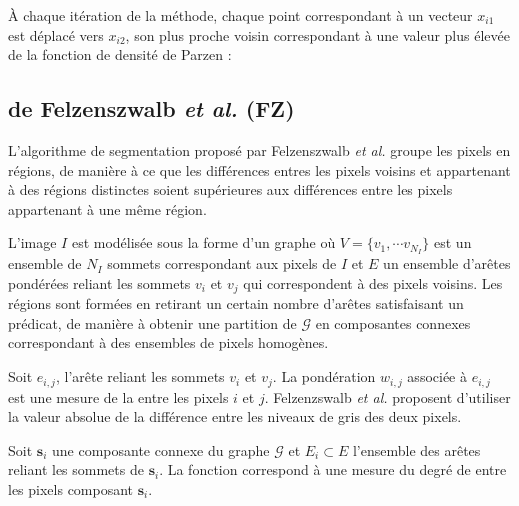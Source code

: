 À chaque itération de la méthode, chaque point correspondant à un vecteur $x_{i1}$ est déplacé vers $x_{i2}$, son plus proche voisin correspondant à une valeur plus élevée de la fonction de densité de Parzen :


\subsection{ de Felzenszwalb \textit{et al.} (FZ)}

L'algorithme de segmentation proposé par Felzenszwalb \textit{et al.} \cite{felzenszwalb2004efficient} groupe les pixels en régions, de manière à ce que les différences entres les pixels voisins et appartenant à des régions distinctes soient supérieures aux différences entre les pixels appartenant à une même région.

L'image $I$ est modélisée sous la forme d'un graphe  où $V=\lbrace v_{1},\cdots v_{N_{I}} \rbrace$ est un ensemble de $N_{I}$ sommets correspondant aux pixels de $I$ et $E$ un ensemble d'arêtes pondérées reliant les sommets $v_{i}$ et $v_{j}$ qui correspondent à des pixels voisins. Les régions sont formées en retirant un certain nombre d'arêtes satisfaisant un prédicat, de manière à obtenir une partition de $\mathcal{G}$ en composantes connexes correspondant à des ensembles de pixels homogènes. 


Soit $e_{i,j}$, l'arête reliant les sommets $v_{i}$ et $v_{j}$. La pondération $w_{i,j}$ associée à  $e_{i,j}$ est une mesure de la  entre les pixels $i$ et $j$. Felzenzswalb \textit{et al.} proposent d'utiliser la valeur absolue de la différence entre les niveaux de gris des deux pixels. 


Soit $\mathbf{s}_{i}$ une composante connexe du graphe $\mathcal{G}$ et $E_{i} \subset E$ l'ensemble des arêtes reliant les sommets de  $\mathbf{s}_{i}$. La fonction 
correspond à une mesure du degré de  entre les pixels composant $\mathbf{s}_{i}$.

